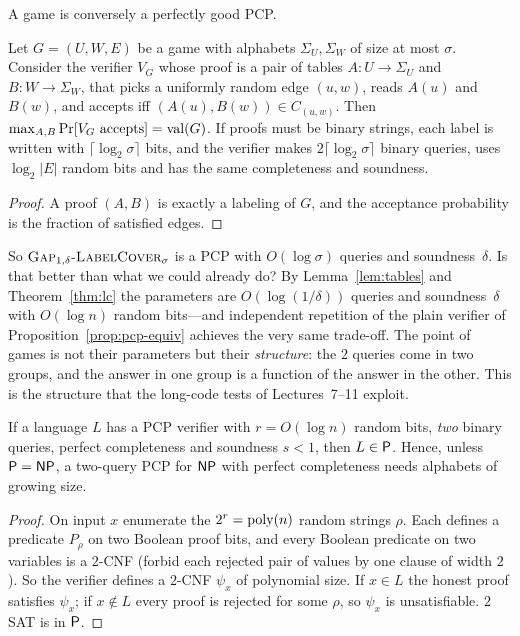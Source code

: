 A game is conversely a perfectly good PCP.

\begin{lemma}\label{lem:tables}
Let $G=(U,W,E)$ be a game with alphabets $\Sigma_U,\Sigma_W$ of size at most $\sigma$.  Consider the verifier $V_G$ whose proof is a
pair of tables $A\colon U\to\Sigma_U$ and $B\colon W\to\Sigma_W$, that picks a uniformly random edge $(u,w)$, reads $A(u)$ and $B(w)$, and accepts
iff $(A(u),B(w))\in C_{(u,w)}$.  Then $\max_{A,B}\Pr[V_G\text{ accepts}]=\operatorname{val}(G)$.  If proofs must be binary strings, each label
is written with $\lceil\log_2\sigma\rceil$ bits, and the verifier makes $2\lceil\log_2\sigma\rceil$ binary queries, uses $\log_2|E|$ random bits
and has the same completeness and soundness.
\end{lemma}
\begin{proof}
A proof $(A,B)$ is exactly a labeling of $G$, and the acceptance probability is the fraction of satisfied edges.
\end{proof}

\noindent
So $\textsc{Gap}_{1,\delta}\text{-}\textsc{LabelCover}_\sigma$ is a PCP with $O(\log\sigma)$ queries and soundness~$\delta$.  Is that better than what we
could already do?  By Lemma~\ref{lem:tables} and Theorem~\ref{thm:lc} the parameters are $O(\log(1/\delta))$ queries and
soundness~$\delta$ with $O(\log n)$ random bits---and independent repetition of the plain verifier of Proposition~\ref{prop:pcp-equiv}
achieves the very same trade-off.  The point of games is not their parameters but their \emph{structure}: the $2$ queries
come in two groups, and the answer in one group is a function of the answer in the other.  This is the structure that the long-code
tests of Lectures~7--11 exploit.

\begin{proposition}\label{prop:2sat}
If a language $L$ has a PCP verifier with $r=O(\log n)$ random bits, \emph{two} binary queries, perfect completeness and soundness $s<1$,
then $L\in\mathsf{P}$.  Hence, unless $\mathsf{P}=\mathsf{NP}$, a two-query PCP for $\mathsf{NP}$ with perfect completeness needs alphabets of growing size.
\end{proposition}
\begin{proof}
On input $x$ enumerate the $2^r=\operatorname{poly}(n)$ random strings $\rho$.  Each defines a predicate $P_\rho$ on two Boolean proof bits,
and every Boolean predicate on two variables is a $2$-CNF (forbid each rejected pair of values by one clause of width $2$).
So the verifier defines a $2$-CNF $\psi_x$ of polynomial size.  If $x\in L$ the honest proof satisfies $\psi_x$; if $x\notin L$ every
proof is rejected for some $\rho$, so $\psi_x$ is unsatisfiable.  $2$SAT is in $\mathsf{P}$.
\end{proof}


